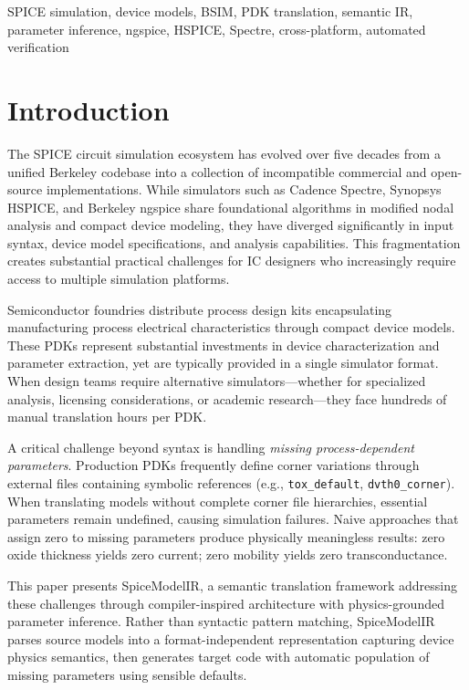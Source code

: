 \documentclass[conference]{IEEEtran}
\begin{document}
\begin{IEEEkeywords}
SPICE simulation, device models, BSIM, PDK translation, semantic IR, parameter inference, ngspice, HSPICE, Spectre, cross-platform, automated verification
\end{IEEEkeywords}

\section{Introduction}

The SPICE circuit simulation ecosystem has evolved over five decades from a unified Berkeley codebase into a collection of incompatible commercial and open-source implementations. While simulators such as Cadence Spectre, Synopsys HSPICE, and Berkeley ngspice share foundational algorithms in modified nodal analysis and compact device modeling, they have diverged significantly in input syntax, device model specifications, and analysis capabilities. This fragmentation creates substantial practical challenges for IC designers who increasingly require access to multiple simulation platforms.

Semiconductor foundries distribute process design kits encapsulating manufacturing process electrical characteristics through compact device models. These PDKs represent substantial investments in device characterization and parameter extraction, yet are typically provided in a single simulator format. When design teams require alternative simulators---whether for specialized analysis, licensing considerations, or academic research---they face hundreds of manual translation hours per PDK.

A critical challenge beyond syntax is handling \emph{missing process-dependent parameters}. Production PDKs frequently define corner variations through external files containing symbolic references (e.g., \texttt{tox\_default}, \texttt{dvth0\_corner}). When translating models without complete corner file hierarchies, essential parameters remain undefined, causing simulation failures. Naive approaches that assign zero to missing parameters produce physically meaningless results: zero oxide thickness yields zero current; zero mobility yields zero transconductance.

This paper presents SpiceModelIR, a semantic translation framework addressing these challenges through compiler-inspired architecture with physics-grounded parameter inference. Rather than syntactic pattern matching, SpiceModelIR parses source models into a format-independent representation capturing device physics semantics, then generates target code with automatic population of missing parameters using sensible defaults.
\end{document}
